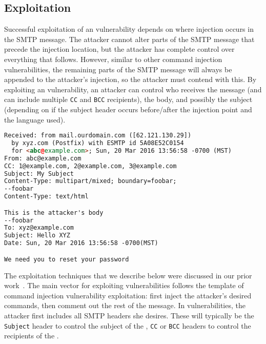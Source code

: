 
\subsection{Exploitation}

\label{exploitation}
Successful exploitation of an \ehi vulnerability depends on where
injection occurs in the SMTP message. The attacker cannot alter parts
of the SMTP message that precede the injection location, but the
attacker has complete control over everything that follows. However,
similar to other command injection vulnerabilities, the remaining
parts of the SMTP message will always be appended to the attacker's
injection, so the attacker must contend with this. By
exploiting an \ehi vulnerability, an attacker can control who receives
the message (and can include multiple \lstinline{CC} and \lstinline{BCC}
recipients), the body, and possibly the subject (depending on if the subject header occurs
before/after the injection point and the language used).

\begin{lstlisting}[language=HTML,caption={Exploiting the \ehi
      vulnerability in Listing~\ref{code:phpemi} to control the
      recipients, subject, and body of the SMTP message.},label={code:ehiexploit}, float]
Received: from mail.ourdomain.com ([62.121.130.29])
  by xyz.com (Postfix) with ESMTP id 5A08E52C0154
  for <abc@example.com>; Sun, 20 Mar 2016 13:56:58 -0700 (MST)
From: abc@example.com
CC: 1@example.com, 2@example.com, 3@example.com
Subject: My Subject
Content-Type: multipart/mixed; boundary=foobar;
--foobar
Content-Type: text/html

This is the attacker's body
--foobar
To: xyz@example.com
Subject: Hello XYZ
Date: Sun, 20 Mar 2016 13:56:58 -0700(MST)

We need you to reset your password
\end{lstlisting}

The exploitation techniques that we describe below were discussed in our prior work~\cite{saipc2017}.
The main vector for exploiting \ehi vulnerabilities follows the
template of command injection vulnerability exploitation: first inject
the attacker's desired commands, then comment out the rest of the
message. In \ehi vulnerabilities, the attacker first includes all SMTP
headers she desires. These will typically be the \lstinline{Subject}
header to control the subject of the \email\footnotemark, \lstinline{CC}
or \lstinline{BCC} headers to control the recipients of the \email.


